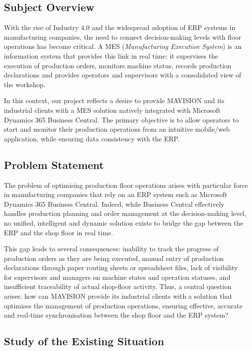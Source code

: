 \subsection{Subject Overview}

With the rise of Industry 4.0 and the widespread adoption of ERP systems in
manufacturing companies, the need to connect decision-making levels with floor
operations has become critical. A MES (\textit{Manufacturing Execution System}) is
an information system that provides this link in real time: it supervises the
execution of production orders, monitors machine status, records production
declarations and provides operators and supervisors with a consolidated view of
the workshop.

In this context, our project reflects a desire to provide MAVISION and its industrial
clients with a MES solution natively integrated with Microsoft Dynamics 365 Business
Central. The primary objective is to allow operators to start and monitor their
production operations from an intuitive mobile/web application, while ensuring data
consistency with the ERP.

\subsection{Problem Statement}

The problem of optimising production floor operations arises with particular force in
manufacturing companies that rely on an ERP system such as Microsoft Dynamics 365
Business Central. Indeed, while Business Central effectively handles production
planning and order management at the decision-making level, no unified, intelligent and
dynamic solution exists to bridge the gap between the ERP and the shop floor in real
time.

This gap leads to several consequences: inability to track the progress of production
orders as they are being executed, manual entry of production declarations through
paper routing sheets or spreadsheet files, lack of visibility for supervisors and
managers on machine states and operation statuses, and insufficient traceability of
actual shop-floor activity. Thus, a central question arises: how can MAVISION provide
its industrial clients with a solution that optimises the management of production
operations, ensuring effective, accurate and real-time synchronisation between the shop
floor and the ERP system?

\subsection{Study of the Existing Situation}

